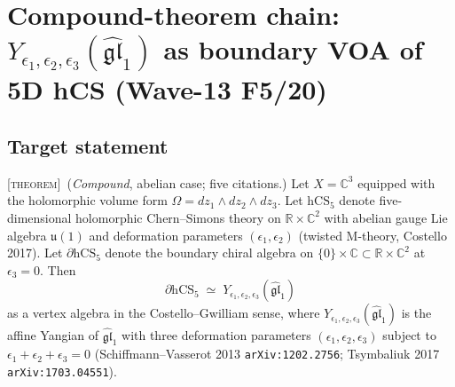 
\providecommand{\ClaimStatusTheorem}{\textsc{[theorem]}}
\providecommand{\ClaimStatusConjectured}{\textsc{[conjectural]}}
\providecommand{\ClaimStatusDefinition}{\textsc{[definition]}}
\providecommand{\kch}{\kappa_{\mathrm{ch}}}
\providecommand{\kcat}{\kappa_{\mathrm{cat}}}
\providecommand{\kBKM}{\kappa_{\mathrm{BKM}}}
\providecommand{\gghone}{\widehat{\mathfrak{gl}}_1}
\providecommand{\hCS}{\mathrm{hCS}}
\providecommand{\Obs}{\mathrm{Obs}}
\providecommand{\Yaff}{Y_{\epsilon_1,\epsilon_2,\epsilon_3}}
\providecommand{\Fgauge}{\mathcal{F}^{\mathrm{gauge}}_\Omega}
\providecommand{\Omegabg}{\Omega}
\providecommand{\C}{\mathbb{C}}
\providecommand{\R}{\mathbb{R}}
\providecommand{\cO}{\mathcal{O}}
\providecommand{\Ran}{\mathrm{Ran}}
\providecommand{\Fact}{\mathrm{Fact}}

\section{Compound-theorem chain: $\Yaff(\gghone)$ as boundary VOA of 5D hCS
  (Wave-13 F5/20)}
\label{wn:sec:wave13-f5-compound-yangian-voa}

\subsection{Target statement}

\ClaimStatusTheorem\ (\emph{Compound}, abelian case; five citations.)
Let $X = \C^3$ equipped with the holomorphic volume form
$\Omegabg = dz_1 \wedge dz_2 \wedge dz_3$. Let $\mathrm{hCS}_5$ denote
five-dimensional holomorphic Chern--Simons theory on $\R \times \C^2$
with abelian gauge Lie algebra $\mathfrak{u}(1)$ and deformation
parameters $(\epsilon_1, \epsilon_2)$ (twisted M-theory, Costello 2017).
Let $\partial \mathrm{hCS}_5$ denote the boundary chiral algebra on
$\{0\} \times \C \subset \R \times \C^2$ at $\epsilon_3 = 0$.
Then
\[
  \partial \mathrm{hCS}_5 \;\simeq\; \Yaff(\gghone)
\]
as a vertex algebra in the Costello--Gwilliam sense, where
$\Yaff(\gghone)$ is the affine Yangian of $\gghone$ with three
deformation parameters $(\epsilon_1, \epsilon_2, \epsilon_3)$
subject to $\epsilon_1 + \epsilon_2 + \epsilon_3 = 0$
(Schiffmann--Vasserot 2013 \texttt{arXiv:1202.2756};
Tsymbaliuk 2017 \texttt{arXiv:1703.04551}).

